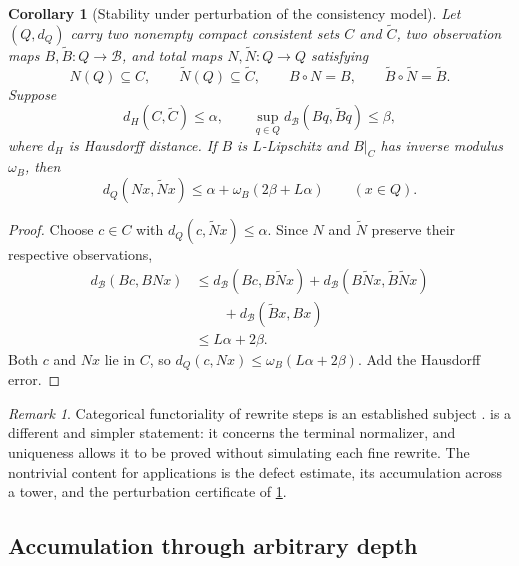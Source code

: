 \documentclass[11pt]{article}
\newtheorem{corollary}[theorem]{Corollary}
\theoremstyle{definition}
\theoremstyle{remark}
\newtheorem{remark}[theorem]{Remark}
\numberwithin{equation}{section}
\newcommand{\cB}{\mathcal B}
\begin{document}
\begin{corollary}[Stability under perturbation of the consistency model]\label{cor:model-perturbation}
Let $(Q,d_Q)$ carry two nonempty compact consistent sets $C$ and $\widetilde C$, two observation maps $B,\widetilde B:Q\to\cB$, and total maps $N,\widetilde N:Q\to Q$ satisfying
\[
 N(Q)\subseteq C,
 \qquad
 \widetilde N(Q)\subseteq\widetilde C,
 \qquad
 B\circ N=B,
 \qquad
 \widetilde B\circ\widetilde N=\widetilde B.
\]
Suppose
\[
 d_H(C,\widetilde C)\le\alpha,
 \qquad
 \sup_{q\in Q}d_{\cB}(Bq,\widetilde Bq)\le\beta,
\]
where $d_H$ is Hausdorff distance.  If $B$ is $L$-Lipschitz and $B|_C$ has inverse modulus $\omega_B$, then
\[
 d_Q(Nx,\widetilde Nx)
 \le
 \alpha+\omega_B(2\beta+L\alpha)
 \qquad(x\in Q).
\]
\end{corollary}

\begin{proof}
Choose $c\in C$ with $d_Q(c,\widetilde Nx)\le\alpha$.  Since $N$ and $\widetilde N$ preserve their respective observations,
\begin{align*}
 d_{\cB}(Bc,BNx)
 &\le d_{\cB}(Bc,B\widetilde Nx)
      +d_{\cB}(B\widetilde Nx,\widetilde B\widetilde Nx)\\
 &\qquad+d_{\cB}(\widetilde Bx,Bx)\\
 &\le L\alpha+2\beta.
\end{align*}
Both $c$ and $Nx$ lie in $C$, so $d_Q(c,Nx)\le\omega_B(L\alpha+2\beta)$.  Add the Hausdorff error.
\end{proof}

\begin{remark}
Categorical functoriality of rewrite steps is an established subject \citep{DuvalEchahedProst2011}.   is a different and simpler statement: it concerns the terminal normalizer, and uniqueness allows it to be proved without simulating each fine rewrite.  The nontrivial content for applications is the defect estimate, its accumulation across a tower, and the perturbation certificate of \cref{cor:model-perturbation}.
\end{remark}

\subsection{Accumulation through arbitrary depth}
\end{document}
